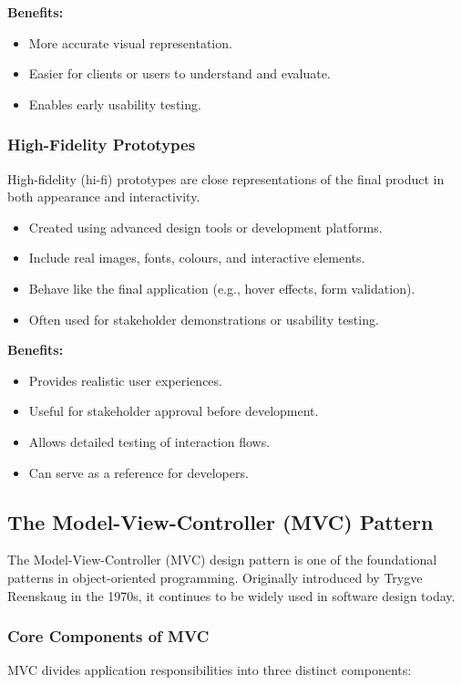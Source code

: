 \documentclass{article}
\begin{document}
\textbf{Benefits:}
\begin{itemize}
    \item More accurate visual representation.
    \item Easier for clients or users to understand and evaluate.
    \item Enables early usability testing.
\end{itemize}

\subsubsection{High-Fidelity Prototypes}

High-fidelity (hi-fi) prototypes are close representations of the final product in both appearance and interactivity.

\begin{itemize}
    \item Created using advanced design tools or development platforms.
    \item Include real images, fonts, colours, and interactive elements.
    \item Behave like the final application (e.g., hover effects, form validation).
    \item Often used for stakeholder demonstrations or usability testing.
\end{itemize}

\textbf{Benefits:}
\begin{itemize}
    \item Provides realistic user experiences.
    \item Useful for stakeholder approval before development.
    \item Allows detailed testing of interaction flows.
    \item Can serve as a reference for developers.
\end{itemize}




\subsection{The Model-View-Controller (MVC) Pattern}

The Model-View-Controller (MVC) design pattern is one of the foundational patterns in object-oriented programming. Originally introduced by Trygve Reenskaug in the 1970s, it continues to be widely used in software design today.

\subsubsection{Core Components of MVC}
MVC divides application responsibilities into three distinct components:
\end{document}
